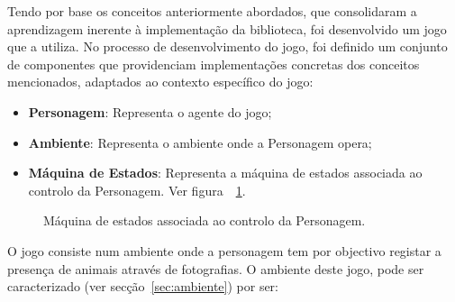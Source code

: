 Tendo por base os conceitos anteriormente abordados, que consolidaram a aprendizagem inerente à implementação da biblioteca, foi desenvolvido um jogo que a utiliza.
No processo de desenvolvimento do jogo, foi definido um conjunto de componentes que providenciam implementações concretas dos conceitos mencionados, adaptados ao contexto específico do jogo:

\begin{itemize}
    \item \textbf{Personagem}: Representa o agente do jogo;
    \item \textbf{Ambiente}: Representa o ambiente onde a Personagem opera;
    \item \textbf{Máquina de Estados}: Representa a máquina de estados associada ao controlo da Personagem.
    Ver figura~~\ref{fig:projeto-parte1-maqest-personagem}.
\end{itemize}

\begin{figure}[H]
    \begin{center}
    \end{center}
    \caption{Máquina de estados associada ao controlo da Personagem.}\label{fig:projeto-parte1-maqest-personagem}
\end{figure}

O jogo consiste num ambiente onde a personagem tem por objectivo registar a presença de animais através de fotografias.
O ambiente deste jogo, pode ser caracterizado (ver secção~\ref{sec:ambiente}) por ser:

